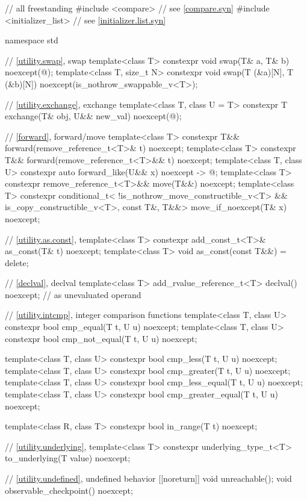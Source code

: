 \begin{codeblock}
// all freestanding
#include <compare>              // see \ref{compare.syn}
#include <initializer_list>     // see \ref{initializer.list.syn}

namespace std {
  // \ref{utility.swap}, swap
  template<class T>
    constexpr void swap(T& a, T& b) noexcept(@\seebelow@);
  template<class T, size_t N>
    constexpr void swap(T (&a)[N], T (&b)[N]) noexcept(is_nothrow_swappable_v<T>);

  // \ref{utility.exchange}, exchange
  template<class T, class U = T>
    constexpr T exchange(T& obj, U&& new_val) noexcept(@\seebelow@);

  // \ref{forward}, forward/move
  template<class T>
    constexpr T&& forward(remove_reference_t<T>& t) noexcept;
  template<class T>
    constexpr T&& forward(remove_reference_t<T>&& t) noexcept;
  template<class T, class U>
    constexpr auto forward_like(U&& x) noexcept -> @\seebelow@;
  template<class T>
    constexpr remove_reference_t<T>&& move(T&&) noexcept;
  template<class T>
    constexpr conditional_t<
        !is_nothrow_move_constructible_v<T> && is_copy_constructible_v<T>, const T&, T&&>
      move_if_noexcept(T& x) noexcept;

  // \ref{utility.as.const}, 
  template<class T>
    constexpr add_const_t<T>& as_const(T& t) noexcept;
  template<class T>
    void as_const(const T&&) = delete;

  // \ref{declval}, declval
  template<class T>
    add_rvalue_reference_t<T> declval() noexcept;   // as unevaluated operand

  // \ref{utility.intcmp}, integer comparison functions
  template<class T, class U>
    constexpr bool cmp_equal(T t, U u) noexcept;
  template<class T, class U>
    constexpr bool cmp_not_equal(T t, U u) noexcept;

  template<class T, class U>
    constexpr bool cmp_less(T t, U u) noexcept;
  template<class T, class U>
    constexpr bool cmp_greater(T t, U u) noexcept;
  template<class T, class U>
    constexpr bool cmp_less_equal(T t, U u) noexcept;
  template<class T, class U>
    constexpr bool cmp_greater_equal(T t, U u) noexcept;

  template<class R, class T>
    constexpr bool in_range(T t) noexcept;

  // \ref{utility.underlying}, 
  template<class T>
    constexpr underlying_type_t<T> to_underlying(T value) noexcept;

  // \ref{utility.undefined}, undefined behavior
  [[noreturn]] void unreachable();
  void observable_checkpoint() noexcept;

}
\end{codeblock}
